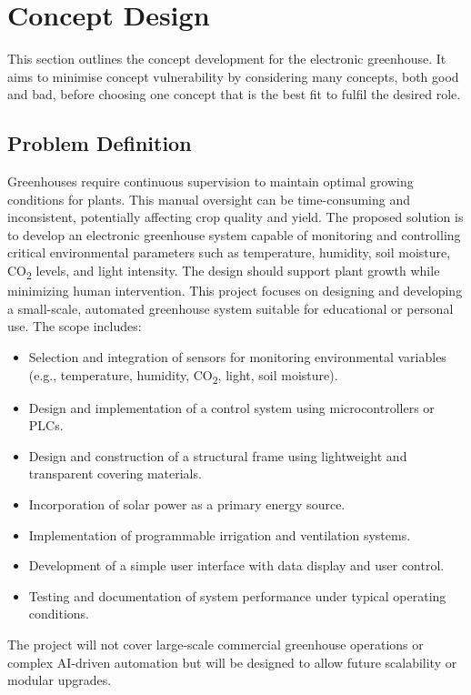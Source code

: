 \chapter{Concept Design}\label{chap:concept}

This section outlines the concept development for the electronic greenhouse. It aims to minimise concept vulnerability by considering many concepts, both good and bad, before choosing one concept that is the best fit to fulfil the desired role.  

\section{Problem Definition}
Greenhouses require continuous supervision to maintain optimal growing conditions for plants. This manual oversight can be time-consuming and inconsistent, potentially affecting crop quality and yield. The proposed solution is to develop an electronic greenhouse system capable of monitoring and controlling critical environmental parameters such as temperature, humidity, soil moisture, CO\textsubscript{2} levels, and light intensity. The design should support plant growth while minimizing human intervention. This project focuses on designing and developing a small-scale, automated greenhouse system suitable for educational or personal use. The scope includes:

\begin{itemize}
    \item Selection and integration of sensors for monitoring environmental variables (e.g., temperature, humidity, CO\textsubscript{2}, light, soil moisture).
    \item Design and implementation of a control system using microcontrollers or PLCs.
    \item Design and construction of a structural frame using lightweight and transparent covering materials.
    \item Incorporation of solar power as a primary energy source.
    \item Implementation of programmable irrigation and ventilation systems.
    \item Development of a simple user interface with data display and user control.
    \item Testing and documentation of system performance under typical operating conditions.
\end{itemize}

The project will not cover large-scale commercial greenhouse operations or complex AI-driven automation but will be designed to allow future scalability or modular upgrades.

